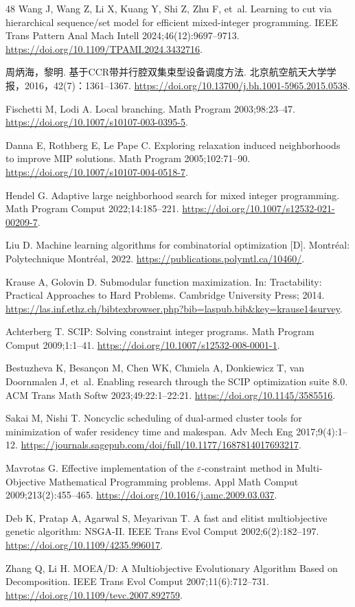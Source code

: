 \begin{thebibliography}{48}
Wang J, Wang Z, Li X, Kuang Y, Shi Z, Zhu F, et~al. Learning to cut via hierarchical sequence/set model for efficient mixed-integer programming.
IEEE Trans Pattern Anal Mach Intell 2024;46(12):9697--9713.
\url{https://doi.org/10.1109/TPAMI.2024.3432716}.

周炳海，黎明. 基于CCR带并行腔双集束型设备调度方法. 北京航空航天大学学报，2016，42(7)：1361--1367.
\url{https://doi.org/10.13700/j.bh.1001-5965.2015.0538}.

Fischetti M, Lodi A. Local branching.
Math Program 2003;98:23--47.
\url{https://doi.org/10.1007/s10107-003-0395-5}.

Danna E, Rothberg E, Le Pape C. Exploring relaxation induced neighborhoods to improve MIP solutions.
Math Program 2005;102:71--90.
\url{https://doi.org/10.1007/s10107-004-0518-7}.

Hendel G. Adaptive large neighborhood search for mixed integer programming.
Math Program Comput 2022;14:185--221.
\url{https://doi.org/10.1007/s12532-021-00209-7}.

Liu D. Machine learning algorithms for combinatorial optimization [D]. Montréal: Polytechnique Montréal, 2022.
\url{https://publications.polymtl.ca/10460/}.

Krause A, Golovin D. Submodular function maximization.
In: Tractability: Practical Approaches to Hard Problems. Cambridge University Press; 2014.
\url{https://las.inf.ethz.ch/bibtexbrowser.php?bib=laspub.bib\&key=krause14survey}.

Achterberg T. {SCIP}: Solving constraint integer programs.
Math Program Comput 2009;1:1--41.
\url{https://doi.org/10.1007/s12532-008-0001-1}.

Bestuzheva K, Besan{\c{c}}on M, Chen WK, Chmiela A, Donkiewicz T, van Doornmalen J, et~al. Enabling research through the {SCIP} optimization suite 8.0.
ACM Trans Math Softw 2023;49:22:1--22:21.
\url{https://doi.org/10.1145/3585516}.

Sakai M, Nishi T. Noncyclic scheduling of dual-armed cluster tools for minimization of wafer residency time and makespan.
Adv Mech Eng 2017;9(4):1--12.
\url{https://journals.sagepub.com/doi/full/10.1177/1687814017693217}.

Mavrotas G. Effective implementation of the $\varepsilon$-constraint method in Multi-Objective Mathematical Programming problems.
Appl Math Comput 2009;213(2):455--465.
\url{https://doi.org/10.1016/j.amc.2009.03.037}.

Deb K, Pratap A, Agarwal S, Meyarivan T. A fast and elitist multiobjective genetic algorithm: NSGA-II.
IEEE Trans Evol Comput 2002;6(2):182--197.
\url{https://doi.org/10.1109/4235.996017}.

Zhang Q, Li H. MOEA/D: A Multiobjective Evolutionary Algorithm Based on Decomposition.
IEEE Trans Evol Comput 2007;11(6):712--731.
\url{https://doi.org/10.1109/tevc.2007.892759}.
\end{thebibliography}
